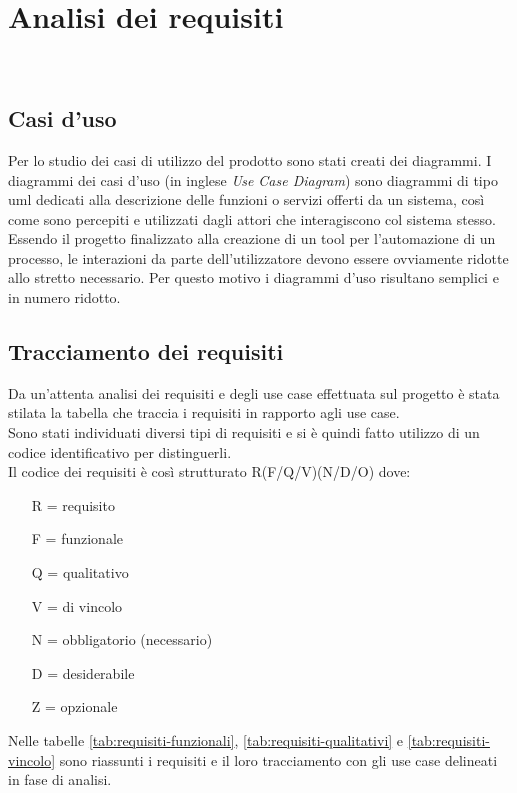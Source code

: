 
\chapter{Analisi dei requisiti}
\label{cap:analisi-requisiti}

\\

\section{Casi d'uso}

Per lo studio dei casi di utilizzo del prodotto sono stati creati dei diagrammi.
I diagrammi dei casi d'uso (in inglese \emph{Use Case Diagram}) sono diagrammi di tipo \gls{uml} dedicati alla descrizione delle funzioni o servizi offerti da un sistema, così come sono percepiti e utilizzati dagli attori che interagiscono col sistema stesso.
Essendo il progetto finalizzato alla creazione di un tool per l'automazione di un processo, le interazioni da parte dell'utilizzatore devono essere ovviamente ridotte allo stretto necessario. Per questo motivo i diagrammi d'uso risultano semplici e in numero ridotto.








\section{Tracciamento dei requisiti}

Da un'attenta analisi dei requisiti e degli use case effettuata sul progetto è stata stilata la tabella che traccia i requisiti in rapporto agli use case.\\
Sono stati individuati diversi tipi di requisiti e si è quindi fatto utilizzo di un codice identificativo per distinguerli.\\
Il codice dei requisiti è così strutturato R(F/Q/V)(N/D/O) dove:
\begin{enumerate}
  \item[R =] requisito
  \item[F =] funzionale
  \item[Q =] qualitativo
  \item[V =] di vincolo
  \item[N =] obbligatorio (necessario)
  \item[D =] desiderabile
  \item[Z =] opzionale
\end{enumerate}
Nelle tabelle \ref{tab:requisiti-funzionali}, \ref{tab:requisiti-qualitativi} e \ref{tab:requisiti-vincolo} sono riassunti i requisiti e il loro tracciamento con gli use case delineati in fase di analisi.

